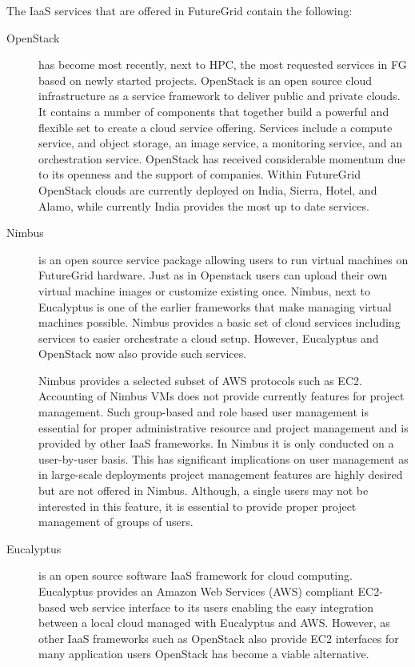 \documentclass{article}
\begin{document}
The IaaS services that are offered in FutureGrid contain the following:

\begin{description}
\item [OpenStack] has become most recently, next to HPC, the most requested services in FG based on newly started projects. OpenStack is an open source cloud infrastructure as a service framework to deliver public and private clouds. It contains a number of components that together build a powerful and flexible set to create a cloud service offering. Services include a compute service, and object storage, an image service, a monitoring service, and an orchestration service. OpenStack has received considerable momentum due to its openness and the support of companies. Within FutureGrid OpenStack clouds are currently deployed on India, Sierra, Hotel, and Alamo, while currently India provides the most up to date services.  

\item [Nimbus] is an open source service package allowing users to run virtual machines on FutureGrid hardware. Just as in Openstack users can upload their own virtual machine images or customize existing once. Nimbus, next to Eucalyptus is one of the earlier frameworks that make managing virtual machines possible. Nimbus provides a basic set of cloud services including services to easier orchestrate a cloud setup. However, Eucalyptus and OpenStack now also provide such services. 

Nimbus provides a selected subset of AWS protocols such as EC2. Accounting of Nimbus VMs does not provide currently features for project management. Such group-based and role based user management is essential for proper administrative resource and project management and is provided by other IaaS frameworks. In Nimbus it is  only conducted on a user-by-user basis. This has significant implications on user management as in large-scale deployments project management features are highly desired but are not offered in Nimbus. Although, a single users may not be interested in this feature, it is essential to provide proper project management of groups of users. 

\item [Eucalyptus] is an open source software IaaS framework for cloud computing. Eucalyptus provides an Amazon Web Services (AWS) compliant EC2-based web service interface to its users enabling the easy integration between a local cloud managed with Eucalyptus and AWS. However, as other IaaS frameworks such as OpenStack also provide EC2 interfaces for many application users OpenStack has become a viable alternative.

\end{description}
\end{document}

